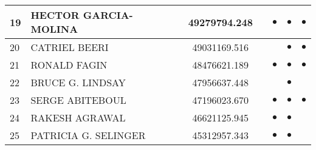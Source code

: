 \documentclass[12pt,titlepage]{report}
\begin{document}
\begin{center}
\begin{tabular}{|l|l|c|c|c|c|c|}
\hline
19 & HECTOR GARCIA-MOLINA & 49279794.248& & $\bullet$ & $\bullet$ & $\bullet$ \\
\hline
20 & CATRIEL BEERI & 49031169.516&         &         &$\bullet$&$\bullet$\\
\hline
21 & RONALD FAGIN & 48476621.189& & $\bullet$ & $\bullet$ & $\bullet$ \\
\hline
22 & BRUCE G. LINDSAY & 47956637.448&         &         &$\bullet$&         \\
\hline
23 & SERGE ABITEBOUL & 47196023.670& & $\bullet$ & $\bullet$ & $\bullet$ \\
\hline
24 & RAKESH AGRAWAL & 46621125.945&&$\bullet$&$\bullet$&         \\
\hline
25 & PATRICIA G. SELINGER & 45312957.343 & & $\bullet$ & $\bullet$ & \\ 
\hline
\end{tabular}
\end{center}
\end{document}
